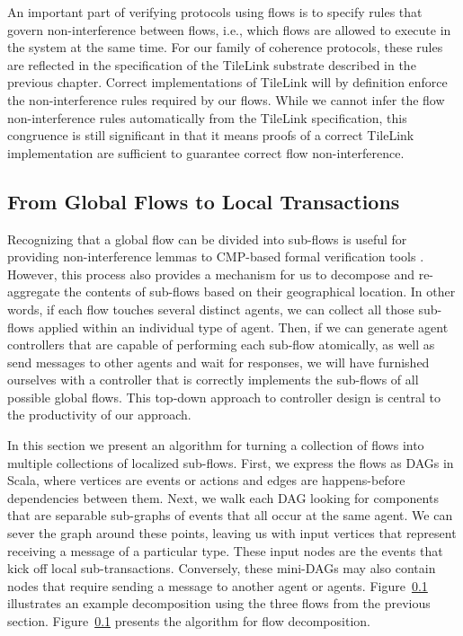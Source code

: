An important part of verifying protocols using flows is to specify rules that govern non-interference between flows,
i.e., which flows are allowed to execute in the system at the same time.
For our family of coherence protocols, these rules are reflected in the specification of the TileLink substrate
described in the previous chapter.
Correct implementations of TileLink will by definition enforce the non-interference rules required by our flows.
While we cannot infer the flow non-interference rules automatically from the TileLink specification,
this congruence is still significant in that it means proofs of a correct TileLink implementation
are sufficient to guarantee correct flow non-interference.

\subsection{From Global Flows to Local Transactions}

Recognizing that a global flow can be divided into sub-flows is useful for providing non-interference lemmas to CMP-based formal verification tools \cite{oleary-fmcad09}.
However, this process also provides a mechanism for us to decompose and re-aggregate the contents of sub-flows based on their geographical location.
In other words, if each flow touches several distinct agents, 
we can collect all those sub-flows applied within an individual type of agent.
Then, if we can generate agent controllers that are capable of performing each sub-flow atomically,
as well as send messages to other agents and wait for responses,
we will have furnished ourselves with a controller that is correctly implements the sub-flows of all
possible global flows.
This top-down approach to controller design is central to the productivity of our approach.

In this section we present an algorithm for turning a collection of flows into multiple collections of localized sub-flows.
First, we express the flows as DAGs in Scala, where vertices are events or actions and edges are happens-before dependencies between them.
Next, we walk each DAG looking for components that are separable sub-graphs of events that all occur at the same agent.
We can sever the graph around these points, leaving us with input vertices that represent receiving a message of a particular type.
These input nodes are the events that kick off local sub-transactions.
Conversely, these mini-DAGs may also contain nodes that require sending a message to another agent or agents.
Figure~\ref{} illustrates an example decomposition using the three flows from the previous section.
Figure~\ref{} presents the algorithm for flow decomposition.

